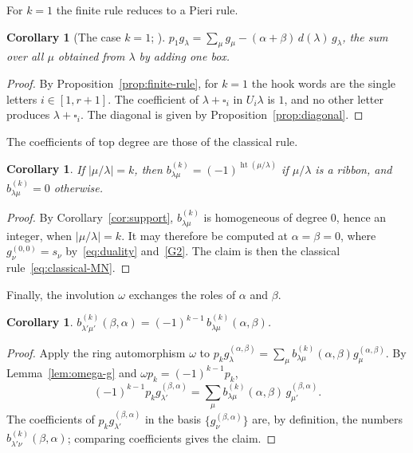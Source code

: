 \documentclass[11pt]{amsart}
\numberwithin{equation}{section}
\newtheorem{corollary}[theorem]{Corollary}
\theoremstyle{definition}
\theoremstyle{remark}
\newcommand{\hgt}{\operatorname{ht}}
\begin{document}
For $k=1$ the finite rule reduces to a Pieri rule.

\begin{corollary}[The case $k=1$; {\cite[Prop.~8.12]{Yeliussizov}}]\label{cor:p1}
$p_1g_\lambda=\sum_{\mu}g_\mu-(\alpha+\beta)\,d(\lambda)\,g_\lambda$, the sum over
all $\mu$ obtained from $\lambda$ by adding one box.
\end{corollary}

\begin{proof}
By Proposition~\ref{prop:finite-rule}, for $k=1$ the hook words are the
single letters $i\in[1,r+1]$. The coefficient of
$\lambda+\square_i$ in $U_i\lambda$ is $1$, and no other letter produces
$\lambda+\square_i$. The diagonal is given by
Proposition~\ref{prop:diagonal}.
\end{proof}

The coefficients of top degree are those of the classical rule.

\begin{corollary}\label{cor:top}
If $|\mu/\lambda|=k$, then $b^{(k)}_{\lambda\mu}=(-1)^{\hgt(\mu/\lambda)}$ if
$\mu/\lambda$ is a ribbon, and $b^{(k)}_{\lambda\mu}=0$ otherwise.
\end{corollary}

\begin{proof}
By Corollary~\ref{cor:support}, $b^{(k)}_{\lambda\mu}$ is homogeneous of
degree $0$, hence an integer, when $|\mu/\lambda|=k$. It may therefore be
computed at $\alpha=\beta=0$, where $g^{(0,0)}_\nu=s_\nu$ by~\eqref{eq:duality}
and~\ref{G2}. The claim is then the classical rule~\eqref{eq:classical-MN}.
\end{proof}

Finally, the involution $\omega$ exchanges the roles of $\alpha$ and $\beta$.

\begin{corollary}\label{cor:omega}
$b^{(k)}_{\lambda'\mu'}(\beta,\alpha)=(-1)^{k-1}\,b^{(k)}_{\lambda\mu}(\alpha,\beta)$.
\end{corollary}

\begin{proof}
Apply the ring automorphism $\omega$ to
$p_kg^{(\alpha,\beta)}_\lambda=\sum_\mu b^{(k)}_{\lambda\mu}(\alpha,\beta)g^{(\alpha,\beta)}_\mu$.
By Lemma~\ref{lem:omega-g} and $\omega p_k=(-1)^{k-1}p_k$,
\[
 (-1)^{k-1}p_kg^{(\beta,\alpha)}_{\lambda'}
 =\sum_\mu b^{(k)}_{\lambda\mu}(\alpha,\beta)\,g^{(\beta,\alpha)}_{\mu'} .
\]
The coefficients of $p_kg^{(\beta,\alpha)}_{\lambda'}$ in the basis
$\{g^{(\beta,\alpha)}_\nu\}$ are, by definition, the numbers
$b^{(k)}_{\lambda'\nu}(\beta,\alpha)$; comparing coefficients gives the claim.
\end{proof}
\end{document}

